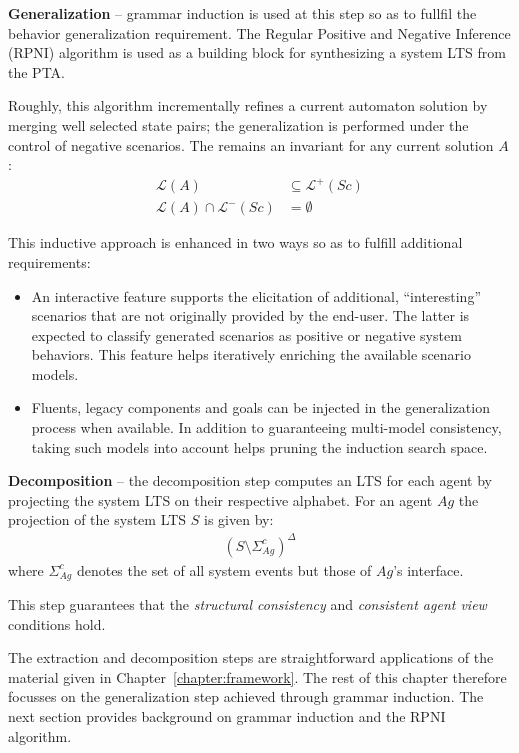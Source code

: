 \noindent \textbf{Generalization} -- grammar induction is used at this step so as to fullfil the behavior generalization requirement. The Regular Positive and Negative Inference (RPNI) algorithm is used as a building block \cite{Oncina:1992} for synthesizing a system LTS from the PTA.

Roughly, this algorithm incrementally refines a current automaton solution by merging well selected state pairs; the generalization is performed under the control of negative scenarios. The  remains an invariant for any current solution $A$:
\begin{align*}
\mathcal{L}(A) &\subseteq \mathcal{L}^+(Sc)\\
\mathcal{L}(A) \cap \mathcal{L}^-(Sc) &= \emptyset
\end{align*}

This inductive approach is enhanced in two ways so as to fulfill additional requirements:

\begin{itemize}

\item An interactive feature supports the elicitation of additional, ``interesting'' scenarios that are not originally provided by the end-user. The latter is expected to classify generated scenarios as positive or negative system behaviors. This feature helps iteratively enriching the available scenario models.

\item Fluents, legacy components and goals can be injected in the generalization process when available. In addition to guaranteeing multi-model consistency, taking such models into account helps pruning the induction search space.

\end{itemize}

\noindent \textbf{Decomposition} -- the decomposition step computes an LTS for each agent by projecting the system LTS on their respective alphabet. For an agent $Ag$ the projection of the system LTS $S$ is given by:
\begin{align}
(S \setminus \Sigma_{Ag}^c)^\Delta
\end{align}
\noindent where $\Sigma_{Ag}^c$ denotes the set of all system events but those of $Ag$'s interface.

This step guarantees that the \emph{structural consistency} and \emph{consistent agent view} conditions hold.

The extraction and decomposition steps are straightforward applications of the material given in Chapter~\ref{chapter:framework}. The rest of this chapter therefore focusses on the generalization step achieved through grammar induction. The next section provides background on grammar induction and the RPNI algorithm.
